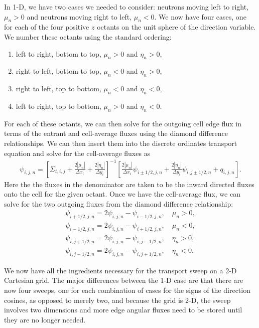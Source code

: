 In 1-D, we have two cases we needed to consider: neutrons moving left to right, $\mu_n > 0$ and neutrons moving right to left, $\mu_n < 0$. We now have four cases, one for each of the four positive $z$ octants on the unit sphere of the direction variable. We number these octants using the standard ordering:
\begin{enumerate}
  \item left to right, bottom to top, $\mu_n > 0$ and $\eta_n > 0$, 
  \item right to left, bottom to top, $\mu_n < 0$ and $\eta_n > 0$,
  \item right to left, top to bottom, $\mu_n < 0$ and $\eta_n < 0$,
  \item left to right, top to bottom, $\mu_n > 0$ and $\eta_n < 0$.
\end{enumerate}
For each of these octants, we can then solve for the outgoing cell edge flux in terms of the entrant and cell-average fluxes using the diamond difference relationships. We can then insert them into the discrete ordinates transport equation and solve for the cell-average fluxes as
\begin{align}
  \psi_{i,j,n} = 
  \left[ \Sigma_{t,i,j}  + \frac{2 |\mu_n|}{\Delta x_i} + \frac{2 |\eta_n|}{\Delta y_i} \right]^{-1}
  \left[ \frac{2 |\mu_n|}{\Delta x_i} \psi_{i \pm 1/2,j,n} + \frac{2 |\eta_n|}{\Delta y_i} \psi_{i, j \pm 1/2,n} + q_{i,j,n} \right] .
\end{align}
Here the the fluxes in the denominator are taken to be the inward directed fluxes onto the cell for the given octant. Once we have the cell-average flux, we can solve for the two outgoing fluxes from the diamond difference relationship:
\begin{subequations} \label{Eq:transport_discreteOrdinates2D_OutwardEdgeAngularFluxSolution}
\begin{align}
  \psi_{i+1/2,j,n} = 2 \psi_{i,j,n} - \psi_{i-1/2,j,n}, \quad \mu_n  > 0, \\
  \psi_{i-1/2,j,n} = 2 \psi_{i,j,n} - \psi_{i+1/2,j,n}, \quad \mu_n  < 0, \\  
  \psi_{i,j+1/2,n} = 2 \psi_{i,j,n} - \psi_{i,j-1/2,n}, \quad \eta_n > 0, \\
  \psi_{i,j-1/2,n} = 2 \psi_{i,j,n} - \psi_{i,j+1/2,n}, \quad \eta_n < 0.  
\end{align}
\end{subequations}

We now have all the ingredients necessary for the transport sweep on a 2-D Cartesian grid. The major differences between the 1-D case are that there are now four sweeps, one for each combination of cases for the signs of the direction cosines, as opposed to merely two, and because the grid is 2-D, the sweep involves two dimensions and more edge angular fluxes need to be stored until they are no longer needed.

